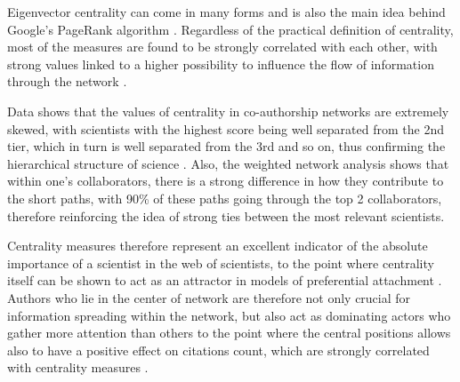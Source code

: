 Eigenvector centrality can come in many forms \cite{Katz1953} and is also
the main idea behind Google's PageRank algorithm \cite{page1999pagerank}. Regardless of the practical definition of centrality, most of the measures are found to be strongly correlated with each other, with strong
values linked to a higher possibility to influence the flow of information through the network \cite{Valente2008}.

Data shows that the values of centrality in co-authorship networks are extremely skewed, with scientists with the highest score being
well separated from the 2nd tier, which in turn is well separated from the 3rd and so on, thus confirming the hierarchical structure
of science \cite{Newman2001}. Also, the weighted network analysis shows that within one's collaborators, there is a strong difference in how they contribute to the short paths, with 90\% of these paths
going through the top 2 collaborators, therefore reinforcing the idea of strong ties between the most relevant scientists.

Centrality measures therefore represent an excellent indicator of the absolute
importance of a scientist in the web of scientists, to the point where centrality itself can be shown to act as an attractor in models of preferential attachment  \cite{Abbasi2012403}. Authors who lie in
the center of network are therefore not only crucial for information spreading within the network, but also act as dominating actors who gather more attention than others to the point where the central positions
allows also to have a positive effect on citations count, which are strongly correlated with centrality measures \cite{Abbasi2011594,Sarigol2014}.





